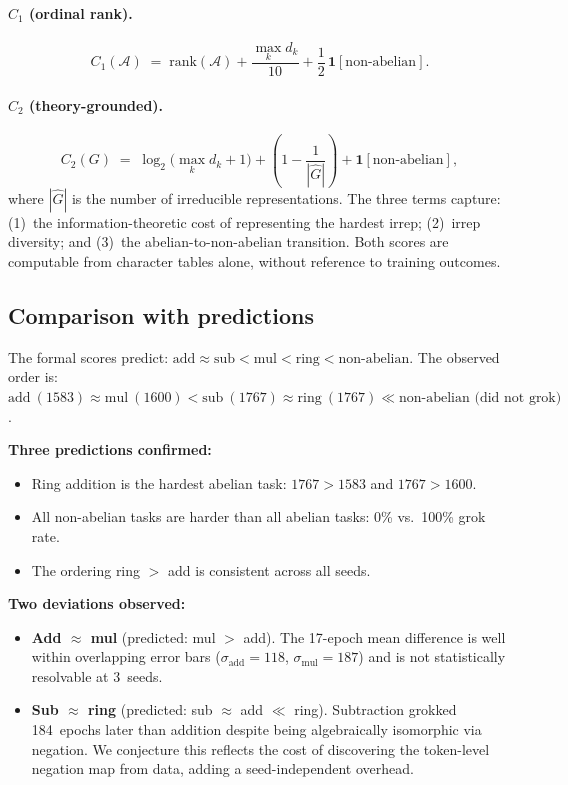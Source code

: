 \documentclass[11pt]{article}
\begin{document}
\paragraph{$C_1$ (ordinal rank).}
\begin{equation}
  C_1(\mathcal{A}) \;=\;
  \mathrm{rank}(\mathcal{A})
  + \frac{\max_k d_k}{10}
  + \frac{1}{2}\,\mathbf{1}[\text{non-abelian}].
  \label{eq:c1}
\end{equation}

\paragraph{$C_2$ (theory-grounded).}
\begin{equation}
  C_2(G) \;=\;
  \log_2\!\bigl(\max_k d_k + 1\bigr)
  + \left(1 - \frac{1}{|\widehat{G}|}\right)
  + \mathbf{1}[\text{non-abelian}],
  \label{eq:c2}
\end{equation}
where $|\widehat{G}|$ is the number of irreducible representations.
The three terms capture: (1)~the information-theoretic cost of representing
the hardest irrep; (2)~irrep diversity; and (3)~the abelian-to-non-abelian
transition. Both scores are computable from character tables alone, without
reference to training outcomes.

\subsection{Comparison with predictions}

The formal scores predict:
$\text{add}\approx\text{sub}<\text{mul}<\text{ring}<\text{non-abelian}$.
The observed order is:
$\text{add}\ (1583)\approx\text{mul}\ (1600)<\text{sub}\ (1767)\approx
\text{ring}\ (1767)\ll\text{non-abelian (did not grok)}$.

\noindent\textbf{Three predictions confirmed:}
\begin{itemize}
  \item Ring addition is the hardest abelian task:
        $1767 > 1583$ and $1767 > 1600$. \checkmark
  \item All non-abelian tasks are harder than all abelian tasks:
        0\% vs.\ 100\% grok rate. \checkmark
  \item The ordering ring $>$ add is consistent across all seeds. \checkmark
\end{itemize}

\noindent\textbf{Two deviations observed:}
\begin{itemize}
  \item \textbf{Add $\approx$ mul} (predicted: mul $>$ add).
        The 17-epoch mean difference is well within overlapping error bars
        ($\sigma_{\text{add}}=118$, $\sigma_{\text{mul}}=187$) and is not
        statistically resolvable at 3~seeds.

  \item \textbf{Sub $\approx$ ring} (predicted: sub $\approx$ add $\ll$ ring).
        Subtraction grokked 184~epochs later than addition despite being
        algebraically isomorphic via negation. We conjecture this reflects
        the cost of discovering the token-level negation map from data,
        adding a seed-independent overhead.
\end{itemize}
\end{document}
